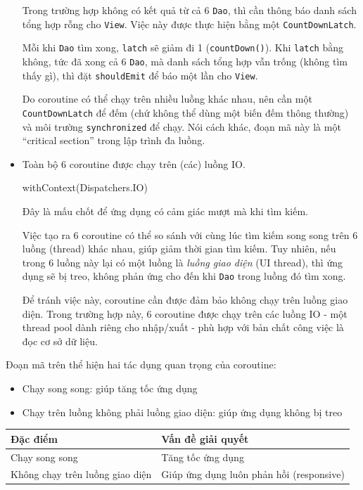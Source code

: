 \documentclass[
]{article}
\newenvironment{Shaded}{}{}
\newcommand{\NormalTok}[1]{#1}
\newcommand{\OperatorTok}[1]{\textcolor[rgb]{0.40,0.40,0.40}{#1}}
\begin{document}
\begin{itemize}
  Trong trường hợp không có kết quả từ cả 6 \texttt{Dao}, thì cần thông
  báo danh sách tổng hợp rỗng cho \texttt{View}. Việc này được thực hiện
  bằng một \texttt{CountDownLatch}.

  Mỗi khi \texttt{Dao} tìm xong, \texttt{latch} sẽ giảm đi 1
  (\texttt{countDown()}). Khi \texttt{latch} bằng không, tức đã xong cả
  6 \texttt{Dao}, mà danh sách tổng hợp vẫn trống (không tìm thấy gì),
  thì đặt \texttt{shouldEmit} để báo một lần cho \texttt{View}.

  Do coroutine có thể chạy trên nhiều luồng khác nhau, nên cần một
  \texttt{CountDownLatch} để đếm (chứ không thể dùng một biến đếm thông
  thường) và môi trường \texttt{synchronized} để chạy. Nói cách khác,
  đoạn mã này là một ``critical section'' trong lập trình đa luồng.
\item
  Toàn bộ 6 coroutine được chạy trên (các) luồng IO.

\begin{Shaded}
\begin{Highlighting}[]
\NormalTok{withContext}\OperatorTok{(}\NormalTok{Dispatchers}\OperatorTok{.}\NormalTok{IO}\OperatorTok{)}
\end{Highlighting}
\end{Shaded}

  Đây là mấu chốt để ứng dụng có cảm giác mượt mà khi tìm kiếm.

  Việc tạo ra 6 coroutine có thể so sánh với cùng lúc tìm kiếm song song
  trên 6 luồng (thread) khác nhau, giúp giảm thời gian tìm kiếm. Tuy
  nhiên, nếu trong 6 luồng này lại có một luồng là \emph{luồng giao
  diện} (UI thread), thì ứng dụng sẽ bị treo, không phản ứng cho đến khi
  \texttt{Dao} trong luồng đó tìm xong.

  Để tránh việc này, coroutine cần được đảm bảo không chạy trên luồng
  giao diện. Trong trường hợp này, 6 coroutine được chạy trên các luồng
  IO - một thread pool dành riêng cho nhập/xuất - phù hợp với bản chất
  công việc là đọc cơ sở dữ liệu.
\end{itemize}

Đoạn mã trên thể hiện hai tác dụng quan trọng của coroutine:

\begin{itemize}
\item
  Chạy song song: giúp tăng tốc ứng dụng
\item
  Chạy trên luồng không phải luồng giao diện: giúp ứng dụng không bị
  treo
\end{itemize}

\begin{longtable}[]{@{}ll@{}}
\toprule
Đặc điểm & Vấn đề giải quyết \\
\midrule
\endhead
Chạy song song & Tăng tốc ứng dụng \\
Không chạy trên luồng giao diện & Giúp ứng dụng luôn phản hồi
(responsive) \\
\bottomrule
\end{longtable}
\end{document}

